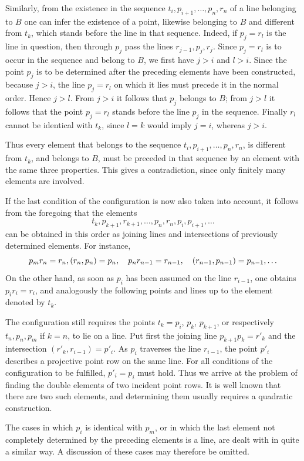 \documentclass[11pt]{article}
\begin{document}
Similarly, from the existence in the sequence $t_i,p_{i+1},\ldots,p_n,r_n$ of a line belonging to $B$ one can infer the existence of a point, likewise belonging to $B$ and different from $t_k$, which stands before the line in that sequence. Indeed, if $p_j=r_l$ is the line in question, then through $p_j$ pass the lines $r_{j-1},p_j,r_j$. Since $p_j=r_l$ is to occur in the sequence and belong to $B$, we first have $j>i$ and $l>i$. Since the point $p_j$ is to be determined after the preceding elements have been constructed, because $j>i$, the line $p_j=r_l$ on which it lies must precede it in the normal order. Hence $j>l$. From $j>i$ it follows that $p_j$ belongs to $B$; from $j>l$ it follows that the point $p_j=r_l$ stands before the line $p_j$ in the sequence. Finally $r_l$ cannot be identical with $t_k$, since $l=k$ would imply $j=i$, whereas $j>i$.

Thus every element that belongs to the sequence $t_i,p_{i+1},\ldots,p_n,r_n$, is different from $t_k$, and belongs to $B$, must be preceded in that sequence by an element with the same three properties. This gives a contradiction, since only finitely many elements are involved.

If the last condition of the configuration is now also taken into account, it follows from the foregoing that the elements
\[
t_k,p_{k+1},r_{k+1},\ldots,p_n,r_n,p_i,p_{i+1},\ldots
\]
can be obtained in this order as joining lines and intersections of previously determined elements. For instance,
\[
 p_m r_n=r_n,\\ (r_n,p_n)=p_n,\quad p_n r_{n-1}=r_{n-1},\quad (r_{n-1},p_{n-1})=p_{n-1},\ldots
\]
On the other hand, as soon as $p_i$ has been assumed on the line $r_{i-1}$, one obtains $p_i r_i=r_i$, and analogously the following points and lines up to the element denoted by $t_k$.

The configuration still requires the points $t_k=p_i$, $p_k$, $p_{k+1}$, or respectively $t_n,p_n,p_m$ if $k=n$, to lie on a line. Put first the joining line $p_{k+1}p_k=r'_k$ and the intersection $(r'_k,r_{i-1})=p'_i$. As $p_i$ traverses the line $r_{i-1}$, the point $p'_i$ describes a projective point row on the same line. For all conditions of the configuration to be fulfilled, $p'_i=p_i$ must hold. Thus we arrive at the problem of finding the double elements of two incident point rows. It is well known that there are two such elements, and determining them usually requires a quadratic construction.

The cases in which $p_i$ is identical with $p_m$, or in which the last element not completely determined by the preceding elements is a line, are dealt with in quite a similar way. A discussion of these cases may therefore be omitted.
\end{document}
